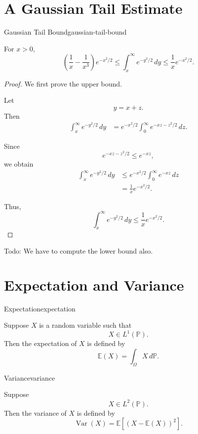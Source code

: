 \section{A Gaussian Tail Estimate}

\begin{theorem}{Gaussian Tail Bound}{gaussian-tail-bound}

For $x>0$,
\[
\left(
\frac{1}{x}-\frac{1}{x^3}
\right)e^{-x^2/2}
\leq
\int_x^\infty e^{-y^2/2}\,dy
\leq
\frac{1}{x}e^{-x^2/2}.
\]

\end{theorem}


\begin{proof}

We first prove the upper bound.

Let
\[
y=x+z.
\]
Then
\[
\begin{aligned}
\int_x^\infty e^{-y^2/2}\,dy
&=
e^{-x^2/2}
\int_0^\infty
e^{-xz-z^2/2}\,dz.
\end{aligned}
\]

Since
\[
e^{-xz-z^2/2}
\leq e^{-xz},
\]
we obtain
\[
\begin{aligned}
\int_x^\infty e^{-y^2/2}\,dy
&\leq
e^{-x^2/2}
\int_0^\infty e^{-xz}\,dz\\
&=
\frac{1}{x}e^{-x^2/2}.
\end{aligned}
\]

Thus,
\[
\boxed{
\int_x^\infty e^{-y^2/2}\,dy
\leq
\frac{1}{x}e^{-x^2/2}
}.
\]

\end{proof}
Todo: We have to compute the lower bound also.

\section{Expectation and Variance}

\begin{definition}{Expectation}{expectation}

Suppose $X$ is a random variable such that
\[
X\in L^1(\mathbb{P}).
\]
Then the expectation of $X$ is defined by
\[
\mathbb{E}(X)
=
\int_\Omega X\,d\mathbb{P}.
\]

\end{definition}


\begin{definition}{Variance}{variance}

Suppose
\[
X\in L^2(\mathbb{P}).
\]
Then the variance of $X$ is defined by
\[
\operatorname{Var}(X)
=
\mathbb{E}
\left[
\left(X-\mathbb{E}(X)\right)^2
\right].
\]

\end{definition}


